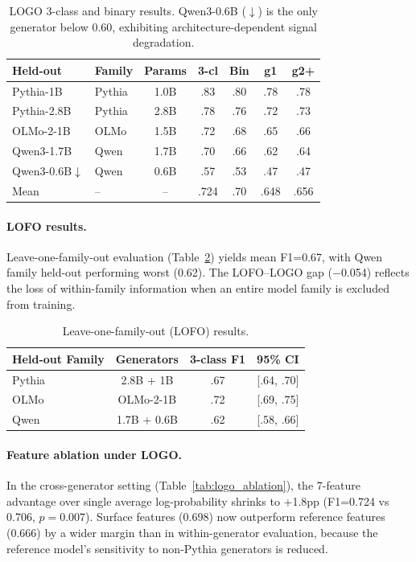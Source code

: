 \documentclass[11pt,a4paper]{article}
\begin{document}
\begin{table}[t]
\centering
\small
\begin{tabular}{llccccc}
\toprule
Held-out & Family & Params & 3-cl & Bin & g1 & g2+ \\
\midrule
Pythia-1B & Pythia & 1.0B & .83 & .80 & .78 & .78 \\
Pythia-2.8B & Pythia & 2.8B & .78 & .76 & .72 & .73 \\
OLMo-2-1B & OLMo & 1.5B & .72 & .68 & .65 & .66 \\
Qwen3-1.7B & Qwen & 1.7B & .70 & .66 & .62 & .64 \\
Qwen3-0.6B$\downarrow$ & Qwen & 0.6B & .57 & .53 & .47 & .47 \\
\midrule
Mean & -- & -- & .724 & .70 & .648 & .656 \\
\bottomrule
\end{tabular}
\caption{LOGO 3-class and binary results. Qwen3-0.6B ($\downarrow$) is the only generator below 0.60, exhibiting architecture-dependent signal degradation.}
\label{tab:logo}
\end{table}

\paragraph{LOFO results.} Leave-one-family-out evaluation (Table~\ref{tab:lofo}) yields mean F1=0.67, with Qwen family held-out performing worst (0.62). The LOFO--LOGO gap ($-$0.054) reflects the loss of within-family information when an entire model family is excluded from training.

\begin{table}[t]
\centering
\small
\begin{tabular}{lccc}
\toprule
Held-out Family & Generators & 3-class F1 & 95\% CI \\
\midrule
Pythia & 2.8B + 1B & .67 & [.64, .70] \\
OLMo & OLMo-2-1B & .72 & [.69, .75] \\
Qwen & 1.7B + 0.6B & .62 & [.58, .66] \\
\bottomrule
\end{tabular}
\caption{Leave-one-family-out (LOFO) results.}
\label{tab:lofo}
\end{table}

\paragraph{Feature ablation under LOGO.} In the cross-generator setting (Table~\ref{tab:logo_ablation}), the 7-feature advantage over single average log-probability shrinks to +1.8pp (F1=0.724 vs 0.706, $p{=}0.007$). Surface features (0.698) now outperform reference features (0.666) by a wider margin than in within-generator evaluation, because the reference model's sensitivity to non-Pythia generators is reduced.
\end{document}
